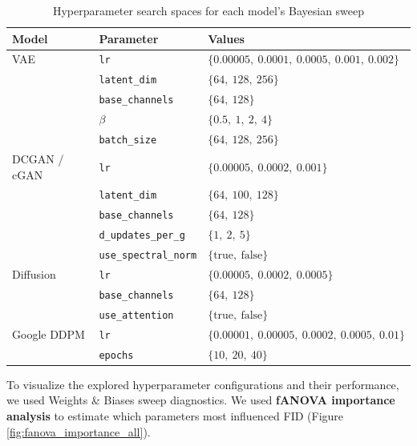 \documentclass[runningheads]{llncs}
\begin{document}
\vspace{-0.3cm}

\begin{table}[H]
\centering
\caption{Hyperparameter search spaces for each model's Bayesian sweep}
\label{tab:sweep_hyperparams}
\setlength{\tabcolsep}{5pt}
\renewcommand{\arraystretch}{1.05}
\begin{tabular}{lll}
\toprule
\textbf{Model} & \textbf{Parameter} & \textbf{Values} \\
\midrule
VAE & \texttt{lr} & $\{0.00005,\ 0.0001,\ 0.0005,\ 0.001,\ 0.002\}$ \\
    & \texttt{latent\_dim} & $\{64,\ 128,\ 256\}$ \\
    & \texttt{base\_channels} & $\{64,\ 128\}$ \\
    & $\beta$ & $\{0.5,\ 1,\ 2,\ 4\}$ \\
    & \texttt{batch\_size} & $\{64,\ 128,\ 256\}$ \\
\midrule
DCGAN / cGAN & \texttt{lr} & $\{0.00005,\ 0.0002,\ 0.001\}$ \\
             & \texttt{latent\_dim} & $\{64,\ 100,\ 128\}$ \\
             & \texttt{base\_channels} & $\{64,\ 128\}$ \\
             & \texttt{d\_updates\_per\_g} & $\{1,\ 2,\ 5\}$ \\
             & \texttt{use\_spectral\_norm} & $\{\text{true},\ \text{false}\}$ \\
\midrule
Diffusion & \texttt{lr} & $\{0.00005,\ 0.0002,\ 0.0005\}$ \\
                 & \texttt{base\_channels} & $\{64,\ 128\}$ \\
                 & \texttt{use\_attention} & $\{\text{true},\ \text{false}\}$ \\
\midrule
Google DDPM & \texttt{lr} & $\{0.00001,\ 0.00005,\ 0.0002,\ 0.0005,\ 0.01\}$ \\
            & \texttt{epochs} & $\{10,\ 20,\ 40\}$ \\
\bottomrule
\end{tabular}
\end{table}

\vspace{-0.5cm}

To visualize the explored hyperparameter configurations and their performance, we used Weights \& Biases sweep diagnostics.
We used \textbf{fANOVA importance analysis} to estimate which parameters most influenced FID (Figure \ref{fig:fanova_importance_all}).
\end{document}
